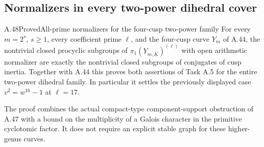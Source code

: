 \subsection{Normalizers in every two-power dihedral cover}

\begin{statement}{A.48}{Proved}{All-prime normalizers for the four-cusp two-power family}
For every \(m=2^s\), \(s\ge1\), every coefficient
prime \(\ell\), and the four-cusp curve \(Y_m\) of
A.44, the nontrivial closed procyclic subgroups of
\(\pi_1(Y_{m,\bar K})^{(\ell)}\) with open
arithmetic normalizer are exactly the nontrivial closed
subgroups of conjugates of cusp inertia. Together with
A.44 this proves both assertions of Task A.5 for the
entire two-power dihedral family. In particular it
settles the previously displayed case
\(v^2=w^{16}-1\) at \(\ell=17\).

The proof combines the actual compact-type
component-support obstruction of A.47 with a bound
on the multiplicity of a Galois character in the
primitive cyclotomic factor. It does not require an
explicit stable graph for these higher-genus curves.
\end{statement}


